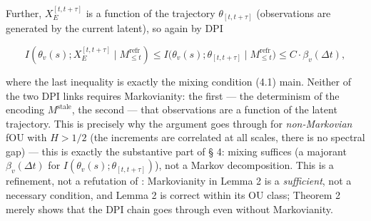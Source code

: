 \documentclass[12pt]{iopart}
\begin{document}
Further, \(X_E^{[t,t+\tau]}\) is a function of the trajectory \(\theta_{[t,t+\tau]}\) (observations are generated by the current latent), so again by DPI



\begin{equation}I(\theta_v(s); X_E^{[t,t+\tau]}\mid M_{\le t}^{\text{refr}}) \le I\big(\theta_v(s); \theta_{[t,t+\tau]}\mid M_{\le t}^{\text{refr}}\big) \le C\cdot\beta_v(\Delta t), \tag{S2.2}\end{equation}



where the last inequality is exactly the mixing condition (4.1) main. Neither of the two DPI links requires Markovianity: the first --- the determinism of the encoding \(M^{\text{stale}}\), the second --- that observations are a function of the latent trajectory. This is precisely why the argument goes through for \emph{non-Markovian} fOU with \(H > 1/2\) (the increments are correlated at all scales, there is no spectral gap) --- this is exactly the substantive part of § 4: mixing suffices (a majorant \(\beta_v(\Delta t)\) for \(I(\theta_v(s);\theta_{[t,t+\tau]})\)), not a Markov decomposition. This is a refinement, not a refutation of \cite{Andriishin2026b}: Markovianity in Lemma 2 is a \emph{sufficient}, not a necessary condition, and Lemma 2 is correct within its OU class; Theorem 2 merely shows that the DPI chain goes through even without Markovianity.
\end{document}
